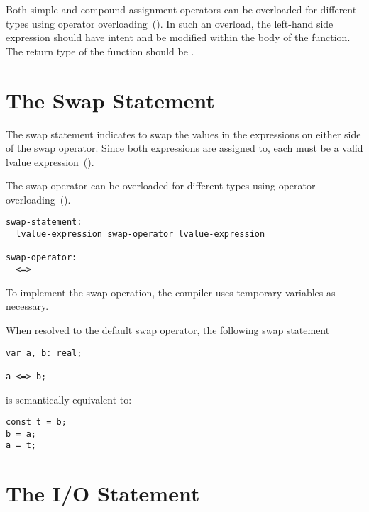 Both simple and compound assignment operators can be overloaded for different
types using operator overloading~().
In such an overload, the left-hand side expression should have
 intent and be modified within the body of the function.  The return
type of the function should be .

\section{The Swap Statement}
\label{The_Swap_Statement}

The swap statement indicates to swap the values in the expressions
on either side of the swap operator.  Since both expressions are assigned
to, each must be a valid lvalue expression~().

The swap operator can be overloaded for different types using operator
overloading~().
\begin{syntax}
\begin{verbatim}
swap-statement:
  lvalue-expression swap-operator lvalue-expression

swap-operator:
  <=>
\end{verbatim}
\end{syntax}

To implement the swap operation, the compiler uses temporary variables
as necessary.

\begin{example}
When resolved to the default swap operator, the following swap statement
\begin{chapel}
\begin{verbatim}
var a, b: real;

a <=> b;
\end{verbatim}
\end{chapel}
is semantically equivalent to:
\begin{chapel}
\begin{verbatim}
const t = b;
b = a;
a = t;
\end{verbatim}
\end{chapel}
\end{example}

\section{The I/O Statement}
\label{The_IO_Statement}

